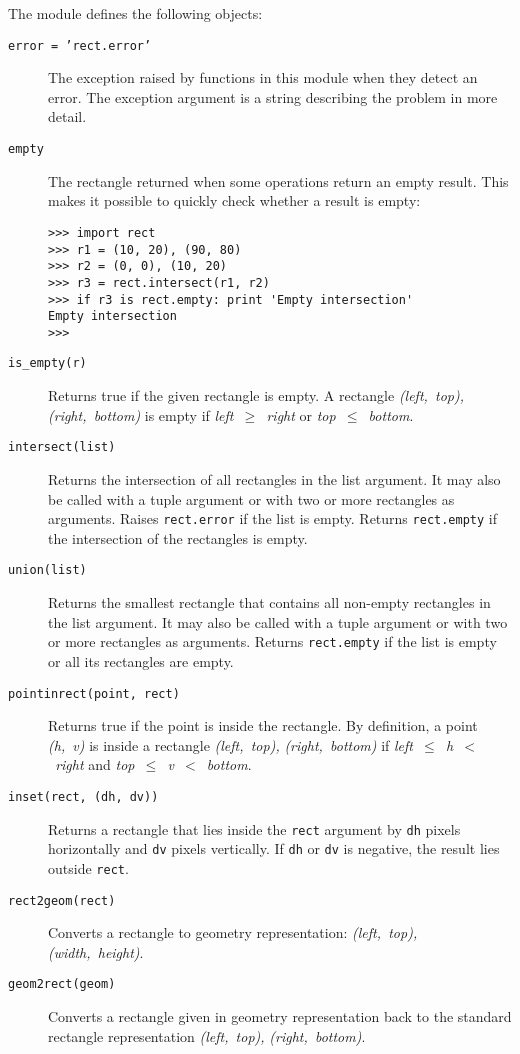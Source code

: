 The module defines the following objects:
\begin{description}
\item[{\tt error = 'rect.error'}]
The exception raised by functions in this module when they detect an
error.
The exception argument is a string describing the problem in more
detail.
\item[{\tt empty}]
The rectangle returned when some operations return an empty result.
This makes it possible to quickly check whether a result is empty:
\bcode\begin{verbatim}
>>> import rect
>>> r1 = (10, 20), (90, 80)
>>> r2 = (0, 0), (10, 20)
>>> r3 = rect.intersect(r1, r2)
>>> if r3 is rect.empty: print 'Empty intersection'
Empty intersection
>>> 
\end{verbatim}\ecode
\item[{\tt is\_empty(r)}]
Returns true if the given rectangle is empty.
A rectangle
{\em (left,~top), (right,~bottom)}
is empty if
{\em left~$\geq$~right}
or
{\em top~$\leq$~bottom}.
\item[{\tt intersect(list)}]
Returns the intersection of all rectangles in the list argument.
It may also be called with a tuple argument or with two or more
rectangles as arguments.
Raises
{\tt rect.error}
if the list is empty.
Returns
{\tt rect.empty}
if the intersection of the rectangles is empty.
\item[{\tt union(list)}]
Returns the smallest rectangle that contains all non-empty rectangles in
the list argument.
It may also be called with a tuple argument or with two or more
rectangles as arguments.
Returns
{\tt rect.empty}
if the list is empty or all its rectangles are empty.
\item[{\tt pointinrect(point, rect)}]
Returns true if the point is inside the rectangle.
By definition, a point
{\em (h,~v)}
is inside a rectangle
{\em (left,~top),}
{\em (right,~bottom)}
if
{\em left~$\leq$~h~$<$~right}
and
{\em top~$\leq$~v~$<$~bottom}.
\item[{\tt inset(rect, (dh, dv))}]
Returns a rectangle that lies inside the
{\tt rect}
argument by
{\tt dh}
pixels horizontally
and
{\tt dv}
pixels
vertically.
If
{\tt dh}
or
{\tt dv}
is negative, the result lies outside
{\tt rect}.
\item[{\tt rect2geom(rect)}]
Converts a rectangle to geometry representation:
{\em (left,~top),}
{\em (width,~height)}.
\item[{\tt geom2rect(geom)}]
Converts a rectangle given in geometry representation back to the
standard rectangle representation
{\em (left,~top),}
{\em (right,~bottom)}.
\end{description}

